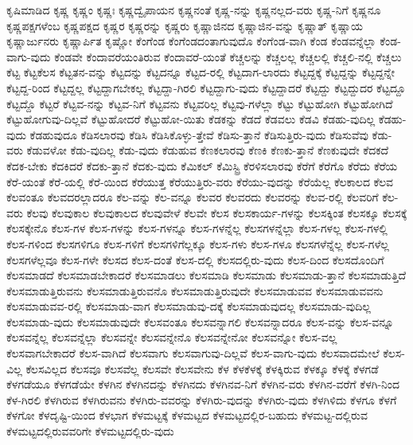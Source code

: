 {ಕೃಷಿಮಾಡಿದ
ಕೃಷ್ಣ
ಕೃಷ್ಣಂ
ಕೃಷ್ಣಃ
ಕೃಷ್ಣದ್ವೈಪಾಯನ
ಕೃಷ್ಣನಂತೆ
ಕೃಷ್ಣ-ನನ್ನು
ಕೃಷ್ಣನಲ್ಲದ-ವರು
ಕೃಷ್ಣ-ನಿಗೆ
ಕೃಷ್ಣನೂ
ಕೃಷ್ಣಪಕ್ಷಗಳೆಂಬ
ಕೃಷ್ಣಪಕ್ಷದ
ಕೃಷ್ಣರ
ಕೃಷ್ಣರನ್ನು
ಕೃಷ್ಣರು
ಕೃಷ್ಣಾಜಿನದ
ಕೃಷ್ಣಾಜಿನ-ವನ್ನು
ಕೃಷ್ಣಾತ್
ಕೃಷ್ಣಾಯ
ಕೃಷ್ಣಾರ್ಜುನರು
ಕೃಷ್ಣಾರ್ಪಿತ
ಕೃಷ್ಣೋ
ಕೆಂಗೆಂಡ
ಕೆಂಗೆಂಡದಂತಾಗುವುದೊ
ಕೆಂಗೆಂಡ-ವಾಗಿ
ಕೆಂಡ
ಕೆಂಡವನ್ನೆಲ್ಲಾ
ಕೆಂಡ-ವಾಗು-ವುದು
ಕೆಂಡವೇ
ಕೆಂದಾವರೆಯಂತಿರುವ
ಕೆಂದಾವರೆ-ಯಂತೆ
ಕೆಚ್ಚಲನ್ನು
ಕೆಚ್ಚಲಲ್ಲ
ಕೆಚ್ಚಲಲ್ಲಿ
ಕೆಚ್ಚಲಿ-ನಲ್ಲಿ
ಕೆಚ್ಚಲು
ಕೆಟ್ಟ
ಕೆಟ್ಟಕೆಲಸ
ಕೆಟ್ಟತನ-ವನ್ನು
ಕೆಟ್ಟದನ್ನು
ಕೆಟ್ಟದನ್ನೂ
ಕೆಟ್ಟದ-ರಲ್ಲಿ
ಕೆಟ್ಟದಾಗ-ಲಾರದು
ಕೆಟ್ಟದ್ದಕ್ಕೆ
ಕೆಟ್ಟದ್ದನ್ನು
ಕೆಟ್ಟದ್ದನ್ನೇ
ಕೆಟ್ಟದ್ದ-ರಿಂದ
ಕೆಟ್ಟದ್ದಲ್ಲ
ಕೆಟ್ಟದ್ದಾಗಬೇಕಲ್ಲ
ಕೆಟ್ಟದ್ದಾ-ಗಿರಲಿ
ಕೆಟ್ಟದ್ದಾಗು-ವುದು
ಕೆಟ್ಟದ್ದಾದರೆ
ಕೆಟ್ಟದ್ದು
ಕೆಟ್ಟದ್ದುದರ
ಕೆಟ್ಟದ್ದೂ
ಕೆಟ್ಟದ್ದೊ
ಕೆಟ್ಟರೆ
ಕೆಟ್ಟವ-ನನ್ನು
ಕೆಟ್ಟವ-ನಿಗೆ
ಕೆಟ್ಟವನು
ಕೆಟ್ಟವರಿಲ್ಲ
ಕೆಟ್ಟವು-ಗಳೆಲ್ಲಾ
ಕೆಟ್ಟು
ಕೆಟ್ಟುಹೋಗಿ
ಕೆಟ್ಟುಹೋಗಿದೆ
ಕೆಟ್ಟುಹೋಗುವು-ದಿಲ್ಲವೆ
ಕೆಟ್ಟುಹೋದರೆ
ಕೆಟ್ಟುಹೋ-ಯಿತು
ಕೆಡಕನ್ನು
ಕೆಡದೆ
ಕೆಡವಲು
ಕೆಡವಿ
ಕೆಡಹು-ವುದಿಲ್ಲ
ಕೆಡಹು-ವುದು
ಕೆಡಹುವುದೂ
ಕೆಡಿಸಲಾರವು
ಕೆಡಿಸಿ
ಕೆಡಿಸಿಕೊಳ್ಳು-ತ್ತೇವೆ
ಕೆಡಿಸು-ತ್ತಾನೆ
ಕೆಡಿಸುತ್ತಿರು-ವುದು
ಕೆಡಿಸುವೆವು
ಕೆಡು-ವರು
ಕೆಡುವಳೋ
ಕೆಡು-ವುದಿಲ್ಲ
ಕೆಡು-ವುದು
ಕೆಡುಹುವ
ಕೆಣಕಲಾರವು
ಕೆಣಕಿ
ಕೆಣಕು-ತ್ತಾನೆ
ಕೆಣಕುವುದೇ
ಕೆದಕದೆ
ಕೆದಕ-ಬೇಕು
ಕೆದಕಿದರೆ
ಕೆದಕು-ತ್ತಾನೆ
ಕೆದಕು-ವುದು
ಕೆಮಿಕಲ್
ಕೆಮಿಸ್ಟ್ರಿ
ಕೆರಳಿಸಲಾರವು
ಕೆರೆಗೆ
ಕೆರೆಗೊ
ಕೆರೆದು
ಕೆರೆಯ
ಕೆರೆ-ಯಂತೆ
ಕೆರೆ-ಯಲ್ಲಿ
ಕೆರೆ-ಯಿಂದ
ಕೆರೆಯುತ್ತ
ಕೆರೆಯುತ್ತಿರು-ವರು
ಕೆರೆಯು-ವುದನ್ನು
ಕೆರೆಯೆಲ್ಲ
ಕೆಲಕಾಲದ
ಕೆಲವ
ಕೆಲವಂತೂ
ಕೆಲವದರಲ್ಲಾದರೂ
ಕೆಲ-ವನ್ನು
ಕೆಲ-ವನ್ನೂ
ಕೆಲವರ
ಕೆಲವರದು
ಕೆಲವರನ್ನು
ಕೆಲವ-ರಲ್ಲಿ
ಕೆಲವರಿಗೆ
ಕೆಲ-ವರು
ಕೆಲವು
ಕೆಲವುಕಾಲ
ಕೆಲವುಕಾಲದ
ಕೆಲವುವೇಳೆ
ಕೆಲವೇ
ಕೆಲಸ
ಕೆಲಸಕಾರ್ಯ-ಗಳನ್ನು
ಕೆಲಸಕ್ಕಿಂತ
ಕೆಲಸಕ್ಕೂ
ಕೆಲಸಕ್ಕೆ
ಕೆಲಸಕ್ಕೇನೊ
ಕೆಲಸ-ಗಳ
ಕೆಲಸ-ಗಳನ್ನು
ಕೆಲಸ-ಗಳನ್ನೂ
ಕೆಲಸ-ಗಳನ್ನೆಲ್ಲ
ಕೆಲಸಗಳನ್ನೆಲ್ಲಾ
ಕೆಲಸ-ಗಳಲ್ಲ
ಕೆಲಸ-ಗಳಲ್ಲಿ
ಕೆಲಸ-ಗಳಿಂದ
ಕೆಲಸಗಳಿಗೂ
ಕೆಲಸ-ಗಳಿಗೆ
ಕೆಲಸಗಳಿಗೆಲ್ಲಕ್ಕೂ
ಕೆಲಸ-ಗಳು
ಕೆಲಸ-ಗಳೂ
ಕೆಲಸಗಳೆನ್ನೆಲ್ಲ
ಕೆಲಸ-ಗಳೆಲ್ಲ
ಕೆಲಸಗಳೆಲ್ಲವೂ
ಕೆಲಸ-ಗಳೇ
ಕೆಲಸದ
ಕೆಲಸ-ದಂತೆ
ಕೆಲಸ-ದಲ್ಲಿ
ಕೆಲಸದಲ್ಲಿರು-ವುದು
ಕೆಲಸ-ದಿಂದ
ಕೆಲಸದೊಂದಿಗೆ
ಕೆಲಸಮಾಡದೆ
ಕೆಲಸಮಾಡಬೇಕಾದರೆ
ಕೆಲಸಮಾಡಲು
ಕೆಲಸಮಾಡಿ
ಕೆಲಸಮಾಡು
ಕೆಲಸಮಾಡು-ತ್ತಾನೆ
ಕೆಲಸಮಾಡುತ್ತಿದೆ
ಕೆಲಸಮಾಡುತ್ತಿರುವನು
ಕೆಲಸಮಾಡುತ್ತಿರುವನೊ
ಕೆಲಸಮಾಡುತ್ತಿರುವುದೇ
ಕೆಲಸಮಾಡುವವ
ಕೆಲಸಮಾಡುವವನು
ಕೆಲಸಮಾಡುವವ-ರಲ್ಲಿ
ಕೆಲಸಮಾಡು-ವಾಗ
ಕೆಲಸಮಾಡುವು-ದಕ್ಕೆ
ಕೆಲಸಮಾಡುವುದಲ್ಲ
ಕೆಲಸಮಾಡು-ವುದಿಲ್ಲ
ಕೆಲಸಮಾಡು-ವುದು
ಕೆಲಸಮಾಡುವುದೇ
ಕೆಲಸವಂತೂ
ಕೆಲಸವನ್ನಾಗಲಿ
ಕೆಲಸವನ್ನಾದರೂ
ಕೆಲಸ-ವನ್ನು
ಕೆಲಸ-ವನ್ನೂ
ಕೆಲಸವನ್ನೆಲ್ಲ
ಕೆಲಸವನ್ನೆಲ್ಲಾ
ಕೆಲಸವನ್ನೇ
ಕೆಲಸವನ್ನೇನೊ
ಕೆಲಸವನ್ನೇನೋ
ಕೆಲಸವನ್ನೋ
ಕೆಲಸ-ವಲ್ಲ
ಕೆಲಸವಾಗಬೇಕಾದರೆ
ಕೆಲಸ-ವಾಗಿದೆ
ಕೆಲಸವಾಗು
ಕೆಲಸವಾಗುವು-ದಿಲ್ಲವೆ
ಕೆಲಸ-ವಾಗು-ವುದು
ಕೆಲಸವಾದಮೇಲೆ
ಕೆಲಸ-ವಿಲ್ಲ
ಕೆಲಸವಿಲ್ಲದ
ಕೆಲಸವೂ
ಕೆಲಸವೆಲ್ಲ
ಕೆಲಸವೇ
ಕೆಲಸವೇನು
ಕೆಳ
ಕೆಳಕೆಳಕ್ಕೆ
ಕೆಳಕ್ಕಿರುವ
ಕೆಳಕ್ಕೂ
ಕೆಳಕ್ಕೆ
ಕೆಳಗಡೆ
ಕೆಳಗಡೆಯೂ
ಕೆಳಗಡೆಯೇ
ಕೆಳಗಿನ
ಕೆಳಗಿನದನ್ನು
ಕೆಳಗಿನದು
ಕೆಳಗಿನವ-ನಿಗೆ
ಕೆಳಗಿನ-ವರು
ಕೆಳಗಿನ-ವರೆಗೆ
ಕೆಳಗಿ-ನಿಂದ
ಕೆಳ-ಗಿರಲಿ
ಕೆಳಗಿರುವ
ಕೆಳಗಿರುವನು
ಕೆಳಗಿರು-ವವರನ್ನು
ಕೆಳಗಿರು-ವುದನ್ನು
ಕೆಳಗಿರು-ವುದು
ಕೆಳಗಿಳಿದು
ಕೆಳಗೂ
ಕೆಳಗೆ
ಕೆಳಗೋ
ಕೆಳದೃಷ್ಟಿ-ಯಿಂದ
ಕೆಳಭಾಗ
ಕೆಳಮಟ್ಟಕ್ಕೆ
ಕೆಳಮಟ್ಟದ
ಕೆಳಮಟ್ಟದಲ್ಲಿರ-ಬಹುದು
ಕೆಳಮಟ್ಟ-ದಲ್ಲಿರುವ
ಕೆಳಮಟ್ಟದಲ್ಲಿರುವವರಿಗೇ
ಕೆಳಮಟ್ಟದಲ್ಲಿರು-ವುದು
}
